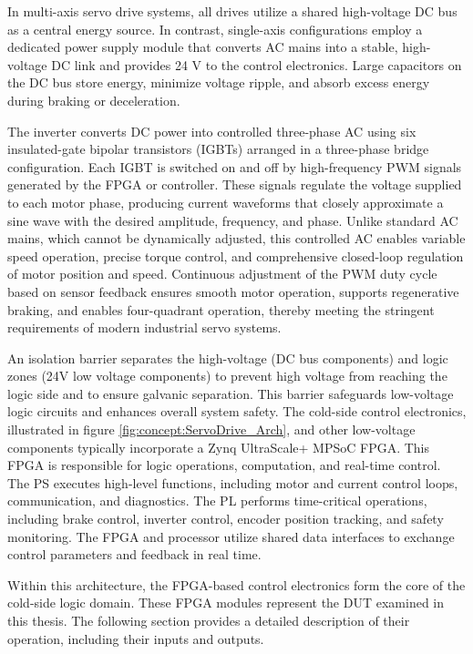In multi-axis servo drive systems, all drives utilize a shared high-voltage \acs{DC} bus as a central energy source. In contrast, single-axis configurations employ a dedicated power supply module that converts \acs{AC} mains into a stable, high-voltage \acs{DC} link and provides 24 V to the control electronics. Large capacitors on the \acs{DC} bus store energy, minimize voltage ripple, and absorb excess energy during braking or deceleration.

The inverter converts \acs{DC} power into controlled three-phase \acs{AC} using six insulated-gate bipolar transistors (IGBTs) arranged in a three-phase bridge configuration. Each \acs{IGBT} is switched on and off by high-frequency \acs{PWM} signals generated by the \acs{FPGA} or controller. These signals regulate the voltage supplied to each motor phase, producing current waveforms that closely approximate a sine wave with the desired amplitude, frequency, and phase. Unlike standard \acs{AC} mains, which cannot be dynamically adjusted, this controlled \acs{AC} enables variable speed operation, precise torque control, and comprehensive closed-loop regulation of motor position and speed. Continuous adjustment of the \acs{PWM} duty cycle based on sensor feedback ensures smooth motor operation, supports regenerative braking, and enables four-quadrant operation, thereby meeting the stringent requirements of modern industrial servo systems. 

An isolation barrier separates the high-voltage (\acs{DC} bus components) and logic zones (24V low voltage components) to prevent high voltage from reaching the logic side and to ensure galvanic separation. This barrier safeguards low-voltage logic circuits and enhances overall system safety. The cold-side control electronics, illustrated in figure \ref{fig:concept:ServoDrive_Arch}, and other low-voltage components typically incorporate a Zynq UltraScale+ \acs{MPSoC} \acs{FPGA}. This \acs{FPGA} is responsible for logic operations, computation, and real-time control. The \acs{PS} executes high-level functions, including motor and current control loops, communication, and diagnostics. The \acs{PL} performs time-critical operations, including brake control, inverter control, encoder position tracking, and safety monitoring. The \acs{FPGA} and processor utilize shared data interfaces to exchange control parameters and feedback in real time.

Within this architecture, the \acs{FPGA}-based control electronics form the core of the cold-side logic domain. These \acs{FPGA} modules represent the \acs{DUT} examined in this thesis. The following section provides a detailed description of their operation, including their inputs and outputs.

